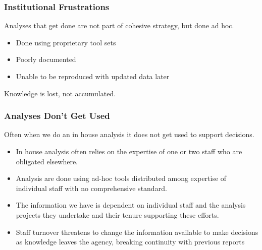 \documentclass[12pt,handout]{beamer}
\begin{document}
\begin{frame}
\frametitle{Institutional Frustrations}
Analyses that get done are not part of cohesive strategy, but done ad hoc.
  \begin{itemize}
  \item Done using proprietary tool sets
  \item Poorly documented
  \item Unable to be reproduced with updated data later
  \end {itemize}
Knowledge is lost, not accumulated.
\end{frame}

{
\begin{frame}[plain]
\end{frame}
}


\begin{frame}
\frametitle{Analyses Don't Get Used}
Often when we do an in house analysis it does not get used to support decisions.
  \begin{itemize}
  \item In house analysis often relies on the expertise of one or two staff who are obligated elsewhere. 
  \pause
  \item Analysis are done using ad-hoc tools distributed among expertise of individual staff with no comprehensive standard. 
  \pause
  \item The information we have is dependent on individual staff and the analysis projects they undertake and their tenure supporting these efforts.
  \pause
  \item Staff turnover threatens to change the information available to make decisions as knowledge leaves the agency, breaking continuity with previous reports
  \end{itemize}
\end{frame}
\end{document}
